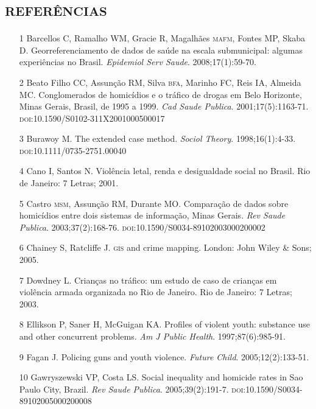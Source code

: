 \documentclass{article}
\begin{document}
\section*{\textsc{referências}}
\begin{itemize}

\item[1] Barcellos C, Ramalho WM, Gracie R, Magalhães \textsc{mafm}, Fontes MP, Skaba D.
Georreferenciamento de dados de saúde na escala submunicipal: algumas
experiências no Brasil. \textit{Epidemiol Serv Saude}. 2008;17(1):59-70.

\item[2] Beato Filho CC, Assunção RM, Silva \textsc{bfa}, Marinho FC, Reis IA, Almeida
MC. Conglomerados de homicídios e o tráfico de drogas em Belo Horizonte, Minas
Gerais, Brasil, de 1995 a 1999. \textit{Cad Saude Publica}. 2001;17(5):1163-71. \textsc{doi}:10.1590/S0102-311X2001000500017

\item[3] Burawoy M. The extended case method. \textit{Sociol Theory}. 1998;16(1):4-33. \textsc{doi}:10.1111/0735-2751.00040

\item[4] Cano I, Santos N. Violência letal, renda e desigualdade social no
Brasil. Rio de Janeiro: 7 Letras; 2001.

\item[5] Castro \textsc{msm}, Assunção RM, Durante MO. Comparação de dados sobre
homicídios entre dois sistemas de informação, Minas Gerais. \textit{Rev Saude
Publica}. 2003;37(2):168-76. \textsc{doi}:10.1590/S0034-89102003000200002

\item[6] Chainey S, Ratcliffe J. \textsc{gis} and crime mapping. London: John Wiley \&
Sons; 2005.

\item[7] Dowdney L. Crianças no tráfico: um estudo de caso de crianças em
violência armada organizada no Rio de Janeiro. Rio de Janeiro: 7 Letras; 2003.

\item[8] Ellikson P, Saner H, McGuigan KA. Profiles of violent youth: substance
use and other concurrent problems. \textit{Am J Public Health}. 1997;87(6):985-91.

\item[9] Fagan J. Policing guns and youth violence. \textit{Future Child}. 2005;12(2):133-51.

\item[10] Gawryszewski VP, Costa LS. Social inequality and homicide rates in Sao
Paulo City, Brazil. \textit{Rev Saude Publica}. 2005;39(2):191-7. \textsc{doi}:10.1590/S0034-89102005000200008


\end{itemize}
\end{document}
